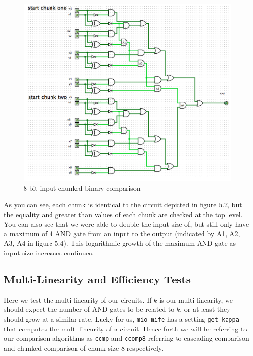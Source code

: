 \documentclass[12pt,twoside]{reedthesis}
\begin{document}
 \begin{figure}[h]
 	\centering
	\includegraphics[scale = .6]{ccomp4_8}
	\caption{8 bit input chunked binary comparison}
	\label{subd}
 \end{figure}
 
 \par As you can see, each chunk is identical to the circuit depicted in figure 5.2, but the equality and greater than values of each chunk are checked at the top level. You can also see that we were able to double the input size of, but still only have a maximum of 4 AND gate from an input to the output (indicated by A1, A2, A3, A4 in figure 5.4). This logarithmic growth of the maximum AND gate as input size increases continues.   
 
 
 \subsection{Multi-Linearity and Efficiency Tests}
 \par Here we test the multi-linearity of our circuits. If $k$ is our multi-linearity, we should expect the number of AND gates to be related to $k$, or at least they should grow at a similar rate. Lucky for us, \texttt{mio mife} has a setting \texttt{get-kappa} that computes the multi-linearity of a circuit. Hence forth we will be referring to our comparison algorithms as \texttt{comp} and \texttt{ccomp8} referring to cascading comparison and chunked comparison of chunk size 8 respectively. 
 
\end{document}
